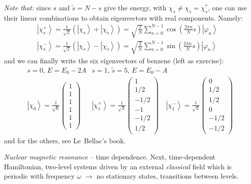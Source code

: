 \documentclass[12pt]{article}
\newcommand{\be}{\begin{equation}}
\newcommand{\ee}{\end{equation}}
\begin{document}
\emph{Note that:} since $s$ and $\tilde{s} = N-s$ give the
energy, with $\chi_{s} \neq \chi_{\tilde{s}}=\chi_{s}^{*}$, one can
use their linear combinations to obtain 
eigenvectors with real components. Namely:
\be
\begin{aligned}
\left|\chi_s^{+}\right\rangle=\frac{1}{\sqrt{2}}\left(\left|\chi_s\right\rangle+\left|\chi_{\tilde{s}}\right\rangle\right)=\sqrt{\frac{2}{N}} \sum_{n=0}^{N-1} \cos \left(\frac{2 \pi n}{N} s\right)\left|\varphi_{n}\right\rangle\\
%
\left|\chi_s^{-}\right\rangle=\frac{1}{\sqrt{2}}\left(\left|\chi_s\right\rangle-\left|\chi_{\tilde{s}}\right\rangle\right)=\sqrt{\frac{2}{N}} \sum_{n=0}^{N-1} \sin \left(\frac{2 \pi n}{N} s\right)\left|\varphi_{n}\right\rangle
\end{aligned}
\ee
and we can finally write the six eigenvectors of benzene (left as exercise):
\be
\begin{aligned}
& s = 0,\,E = E_0 - 2A &
s = 1,\,\tilde{s}=5,\,E = E_0 - A\quad\quad\quad\quad\\
&\left|\chi_{0}\right\rangle=\frac{1}{\sqrt{6}}
\begin{pmatrix}1 \\ 1 \\ 1 \\ 1 \\ 1 \\ 1\end{pmatrix} & 
\left|\chi_{1}^+\right\rangle=\frac{1}{\sqrt{3}}
\begin{pmatrix}1 \\ 1/2 \\ -1/2 \\ -1 \\ -1/2 \\ 1/2\end{pmatrix}
\quad
\left|\chi_{1}^-\right\rangle=\frac{1}{\sqrt{3}}
\begin{pmatrix}0 \\ 1/2 \\ 1/2 \\ 0 \\ -1/2 \\ -1/2\end{pmatrix}
\end{aligned}
\ee
and for the others, see Le~Bellac's book.


\emph{Nuclear magnetic resonance} -- time dependence.
Next, time-dependent Hamiltonian, two-level
systems driven by an external \emph{classical} field
which is periodic with frequency $\omega$
$\to$ no stationary states, transitions between levels.
\end{document}
